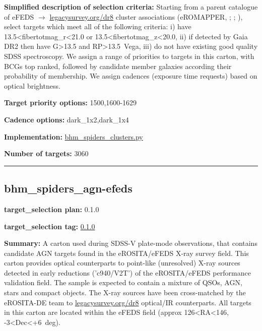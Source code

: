 \noindent\textbf{Simplified description of selection criteria:} Starting from a
parent catalogue of eFEDS $\rightarrow$
\href{https://www.legacysurvey.org/dr8}{legacysurvey.org/dr8} cluster
associations (eROMAPPER,
\citealt{Rykoff2014};
\citealt{IderChitham2020};
\citealt{Liu2022}), select targets which meet all of the following criteria:
i) have 13.5\textless{}fibertotmag\_r\textless{}21.0 or
13.5\textless{}fibertotmag\_z\textless{}20.0, ii) if detected by Gaia
DR2 then have G\textgreater{}13.5 and RP\textgreater{}13.5~Vega, iii) do
not have existing good quality SDSS spectroscopy. We assign a range of
priorities to targets in this carton, with BCGs top ranked, followed by
candidate member galaxies according their probability of membership. We
assign cadences (exposure time requests) based on optical brightness.


\noindent\textbf{Target priority options:} 1500,1600-1629

\noindent\textbf{Cadence options:} dark\_1x2,dark\_1x4

\noindent\textbf{Implementation:}
\href{https://github.com/sdss/target_selection/blob/0.3.0/python/target_selection/cartons/bhm_spiders_clusters.py}{bhm\_spiders\_clusters.py}

\noindent\textbf{Number of targets:} 3060

\begin{center}\rule{0.5\linewidth}{0.5pt}\end{center}

\hypertarget{bhm_spiders_agn-efeds_plan0.1.0}{%
\subsection{bhm\_spiders\_agn-efeds}\label{bhm_spiders_agn-efeds_plan0.1.0}}

\noindent\textbf{target\_selection plan:} 0.1.0

\noindent\textbf{target\_selection tag:}
\href{https://github.com/sdss/target_selection/tree/0.1.0/}{0.1.0}

\noindent\textbf{Summary:} A carton used during SDSS-V plate-mode observations,
that contains candidate AGN targets found in the eROSITA/eFEDS X-ray
survey field. This carton provides optical counterparts to point-like
(unresolved) X-ray sources detected in early reductions ('c940/V2T') of
the eROSITA/eFEDS performance validation field. The sample is expected
to contain a mixture of QSOs, AGN, stars and compact objects. The X-ray
sources have been cross-matched by the eROSITA-DE team to
\href{https://www.legacysurvey.org/dr8/}{legacysurvey.org/dr8}
optical/IR counterparts. All targets in this carton are located within
the eFEDS field (approx 126\textless{}RA\textless{}146,
-3\textless{}Dec\textless{}+6~deg).


